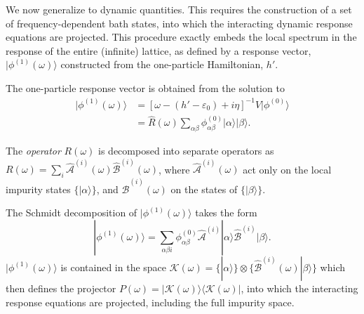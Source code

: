 \documentclass[aps,twocolumn,nobibnotes]{revtex4}
\begin{document}
We now generalize to dynamic quantities. This requires the construction of a set of frequency-dependent bath states, into which the
interacting dynamic response equations are projected. This procedure exactly embeds the local spectrum in the response of the entire (infinite) lattice, 
as defined by a response vector, $|\phi^{(1)}(\omega) \rangle$ constructed from the one-particle Hamiltonian, $h'$.
\begin{inparaenum}
\item The one-particle response vector is obtained from the solution to
\begin{align}
|\phi^{(1)}(\omega) \rangle &= \left[ \omega-(h'-\varepsilon_0)+i\eta \right]^{-1} {\hat V} |\phi^{(0)}\rangle  \nonumber \\ 
                            &= {\hat R}(\omega) \sum_{\alpha \beta} \phi^{(0)}_{\alpha \beta} |\alpha \rangle |\beta \rangle    .
\end{align}
\item The {\em operator} $R(\omega)$ is decomposed into separate operators as $R(\omega) = \sum_i {\hat {\mathcal{A}}}^{(i)}(\omega) {\hat {\mathcal{B}}}^{(i)}(\omega)$, 
where ${\hat {\mathcal{A}}}^{(i)}(\omega)$ act only on the local impurity states $\{ |\alpha \rangle \}$, and ${\hat {\mathcal{B}}}^{(i)}(\omega)$ on the states of $\{ |\beta\rangle \}$.
\item The Schmidt decomposition of $| \phi^{(1)}(\omega) \rangle$ takes the form
\begin{equation}
|\phi^{(1)}(\omega) \rangle = \sum_{\alpha \beta i} \phi^{(0)}_{\alpha \beta} {\hat {\mathcal{A}}}^{(i)} |\alpha \rangle {\hat {\mathcal{B}}}^{(i)} |\beta \rangle .
\end{equation}
$| \phi^{(1)}(\omega) \rangle$ is contained in the space $\mathcal{K}(\omega) = \{ |\alpha \rangle \} \otimes \{\hat {\mathcal{B}}^{(i)}(\omega) | \beta \rangle \}$ which 
then defines the projector $P(\omega) = |\mathcal{K}(\omega)\rangle \langle \mathcal{K}(\omega) |$, into which the interacting response equations are projected, including the full impurity space.

\end{inparaenum}
\end{document}

